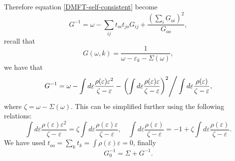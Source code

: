 \documentclass{book}
\numberwithin{equation}{section}
\begin{document}
Therefore equation \eqref{DMFT-self-consistent} become
\begin{equation}
  G^{-1}=\omega-\sum_{ij}t_{oi}t_{jo}G_{ij}+
  \frac{\left(\sum_iG_{oi}\right)^2}{G_{oo}},
\end{equation}
recall that 
\begin{equation}
  G(\omega,k)=\frac{1}{\omega-\varepsilon_k-\Sigma(\omega)},
\end{equation}
we have that
\begin{equation}
  G^{-1}=\omega-\int d\varepsilon
  \frac{\rho(\varepsilon)\varepsilon^2}{\zeta-\varepsilon}
  -\left.\left(\int d\varepsilon
  \frac{\rho(\varepsilon)\varepsilon}{\zeta-\varepsilon}\right)^2\right/
  \int d\varepsilon\frac{\rho(\varepsilon)}{\zeta-\varepsilon},
\end{equation}
where $\zeta=\omega-\Sigma(\omega)$. This can be simplified further
using the following relations:
\begin{equation}
  \int d\varepsilon\frac{\rho(\varepsilon)\varepsilon^2}{\zeta-\varepsilon}
  =\zeta\int d\varepsilon
  \frac{\rho(\varepsilon)\varepsilon}{\zeta-\varepsilon},\quad
  \int d\varepsilon\frac{\rho(\varepsilon)}{\zeta-\varepsilon}=
  -1+\zeta\int d\varepsilon\frac{\rho(\varepsilon)}{\zeta-\varepsilon}.
\end{equation}
We have used $t_{oo}=\sum_kt_k=\int\rho(\varepsilon)\varepsilon=0$, finally
\begin{equation}
  G_0^{-1}=\Sigma+G^{-1}.
\end{equation}
\end{document}
